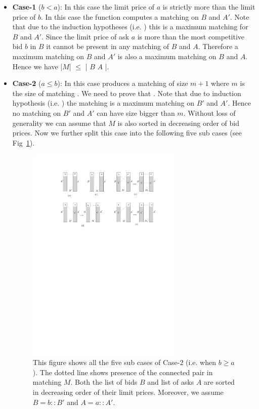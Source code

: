 \documentclass[a4paper,UKenglish,cleveref, autoref]{lipics-v2019}
\begin{document}
\begin{itemize}
\item \textbf{Case-1} ($b<a$): In this case the limit price of $a$ is strictly more than the limit price of $b$.  In this case the function  computes a matching on $B$ and $A'$. Note that due to the induction hypotheses (i.e. ) this is a maximum matching for $B$ and $A'$. Since the limit price of ask $a$ is more than the most competitive bid $b$ in $B$ it cannot be present in any matching of $B$ and $A$. Therefore a maximum matching on $B$ and $A'$ is also a maximum matching on $B$ and $A$. Hence we have |$M$| $\leq$ |  $B$ $A$ |.
\item \textbf{Case-2} ($a \leq b$): In this case  produces a matching of size $m + 1$ where $m$ is the size of matching . We need to prove that . Note that due to induction hypothesis (i.e. ) the matching  is a maximum matching on $B'$ and $A'$.  Hence no matching on $B'$ and $A'$ can have size bigger than $m$. Without loss of generality we can assume that $M$ is also sorted in decreasing order of bid prices. Now we further split this case into the following five sub cases (see Fig~\ref{fig:mmProof}).

\begin{figure}[h!]
\centering
\includegraphics[width=0.7\textwidth]{mm_proof.pdf}
\caption{This figure shows all the five sub cases of Case-2 (i.e. when $b \geq a$). The dotted line shows presence of the connected pair in matching $M$.  Both the list of bids $B$ and list of asks $A$ are sorted in decreasing order of their limit prices. Moreover, we assume $B = b::B'$ and $A = a::A'$.  }
\label{fig:mmProof}
\end{figure}


\end{itemize}
\end{document}
